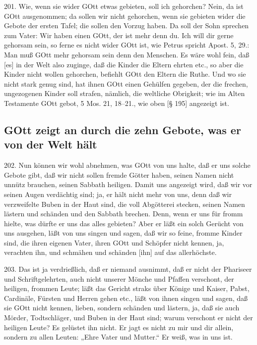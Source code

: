 201. Wie, wenn sie wider GOtt etwas gebieten, soll ich gehorchen? Nein, da ist GOtt ausgenommen; da sollen wir nicht gehorchen, wenn sie gebieten wider die Gebote der ersten Tafel; die sollen den Vorzug haben. Da soll der Sohn sprechen zum Vater: Wir haben einen GOtt, der ist mehr denn du. Ich will dir gerne gehorsam sein, so ferne es nicht wider GOtt ist, wie Petrus spricht Apost. 5, 29.: Man muß GOtt mehr gehorsam sein denn den Menschen. Es wäre wohl fein, daß [es] in der Welt also zuginge, daß die Kinder die Eltern ehrten etc., so aber die Kinder nicht wollen gehorchen, befiehlt GOtt den Eltern die Ruthe. Und wo sie nicht stark genug sind, hat ihnen GOtt einen Gehülfen gegeben, der die frechen, ungezogenen Kinder soll strafen, nämlich, die weltliche Obrigkeit; wie im Alten Testamente GOtt gebot, 5 Mos. 21, 18–21., wie oben [§ 195] angezeigt ist.

\subsection{GOtt zeigt an durch die zehn Gebote, was er von der Welt hält}

202. Nun können wir wohl abnehmen, was GOtt von uns halte, daß er uns solche Gebote gibt, daß wir nicht sollen fremde Götter haben, seinen Namen nicht unnütz brauchen, seinen Sabbath heiligen. Damit uns angezeigt wird, daß wir vor seinen Augen verdächtig sind; ja, er hält nicht mehr von uns, denn daß wir verzweifelte Buben in der Haut sind, die voll Abgötterei stecken, seinen Namen lästern und schänden und den Sabbath brechen. Denn, wenn er uns für fromm hielte, was dürfte er uns das alles gebieten? Aber er läßt ein solch Gerücht von uns ausgehen, läßt von uns singen und sagen, daß wir so feine, fromme Kinder sind, die ihren eigenen Vater, ihren GOtt und Schöpfer nicht kennen, ja, verachten ihn, und schmähen und schänden [ihn] auf das allerhöchste.

203. Das ist ja verdrießlich, daß er niemand ausnimmt, daß er nicht der Phariseer und Schriftgelehrten, auch nicht unserer Mönche und Pfaffen verschont, der heiligen, frommen Leute; läßt das Gericht straks über Könige und Kaiser, Pabst, Cardinäle, Fürsten und Herren gehen etc., läßt von ihnen singen und sagen, daß sie GOtt nicht kennen, lieben, sondern schänden und lästern, ja, daß sie auch Mörder, Todtschläger, und Buben in der Haut sind; warum verschont er nicht der heiligen Leute? Es gelüstet ihn nicht. Er jagt es nicht zu mir und dir allein, sondern zu allen Leuten: „Ehre Vater und Mutter.“ Er weiß, was in uns ist.

